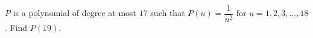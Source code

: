 $P$ is a polynomial of degree at most $17$ such that $P(u)=\dfrac{1}{u^2}$ for $u=1,2,3,\dots,18$. Find $P(19)$.
